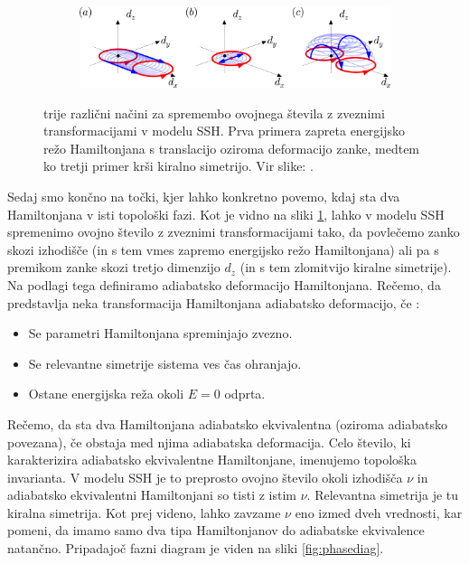 \begin{figure}[!h]
\centering
\begin{subfigure}{.9\textwidth}
\includegraphics[width=\linewidth]{Figures/SymBreak.png}
\end{subfigure}
\caption{trije različni načini za spremembo ovojnega števila z zveznimi transformacijami v modelu SSH. Prva primera zapreta energijsko režo Hamiltonjana s translacijo oziroma deformacijo zanke, medtem ko tretji primer krši kiralno simetrijo. Vir slike: \cite{madzar}.}
\label{fig:symbreak}
\end{figure}

Sedaj smo končno na točki, kjer lahko konkretno povemo, kdaj sta dva Hamiltonjana v isti topološki fazi.
Kot je vidno na sliki \ref{fig:symbreak}, lahko v modelu SSH spremenimo ovojno število z zveznimi transformacijami tako, da povlečemo zanko skozi izhodišče (in s tem vmes zapremo energijsko režo Hamiltonjana) ali pa s premikom zanke skozi tretjo dimenzijo $d_z$ (in s tem zlomitvijo kiralne simetrije). Na podlagi tega definiramo adiabatsko deformacijo Hamiltonjana.
Rečemo, da predstavlja neka transformacija Hamiltonjana adiabatsko deformacijo, če \cite{madzar}:
\begin{itemize}
\item Se parametri Hamiltonjana spreminjajo zvezno.
\item Se relevantne simetrije sistema ves čas ohranjajo.
\item Ostane energijska reža okoli $E=0$ odprta.
\end{itemize}

Rečemo, da sta dva Hamiltonjana adiabatsko ekvivalentna (oziroma adiabatsko povezana), če obstaja med njima adiabatska deformacija. Celo število, ki karakterizira adiabatsko ekvivalentne Hamiltonjane, imenujemo topološka invarianta. V modelu SSH je to preprosto ovojno število okoli izhodišča $\nu$ in adiabatsko ekvivalentni Hamiltonjani so tisti z istim $\nu$. Relevantna simetrija je tu kiralna simetrija. Kot prej videno, lahko zavzame $\nu$ eno izmed dveh vrednosti, kar pomeni, da imamo samo dva tipa Hamiltonjanov do adiabatske ekvivalence natančno. Pripadajoč fazni diagram je viden na sliki \ref{fig:phasediag}.

